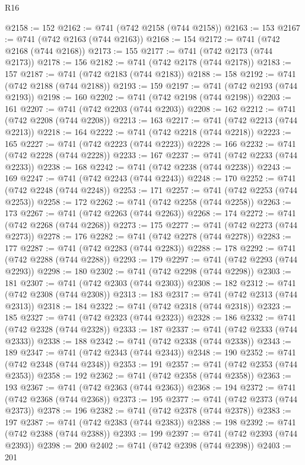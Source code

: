 \begin{lexlean}{R16}
\begin{coremodule}
@2158 := 152
@2162 := @741 (@742 @2158 (@744 @2158))
@2163 := 153
@2167 := @741 (@742 @2163 (@744 @2163))
@2168 := 154
@2172 := @741 (@742 @2168 (@744 @2168))
@2173 := 155
@2177 := @741 (@742 @2173 (@744 @2173))
@2178 := 156
@2182 := @741 (@742 @2178 (@744 @2178))
@2183 := 157
@2187 := @741 (@742 @2183 (@744 @2183))
@2188 := 158
@2192 := @741 (@742 @2188 (@744 @2188))
@2193 := 159
@2197 := @741 (@742 @2193 (@744 @2193))
@2198 := 160
@2202 := @741 (@742 @2198 (@744 @2198))
@2203 := 161
@2207 := @741 (@742 @2203 (@744 @2203))
@2208 := 162
@2212 := @741 (@742 @2208 (@744 @2208))
@2213 := 163
@2217 := @741 (@742 @2213 (@744 @2213))
@2218 := 164
@2222 := @741 (@742 @2218 (@744 @2218))
@2223 := 165
@2227 := @741 (@742 @2223 (@744 @2223))
@2228 := 166
@2232 := @741 (@742 @2228 (@744 @2228))
@2233 := 167
@2237 := @741 (@742 @2233 (@744 @2233))
@2238 := 168
@2242 := @741 (@742 @2238 (@744 @2238))
@2243 := 169
@2247 := @741 (@742 @2243 (@744 @2243))
@2248 := 170
@2252 := @741 (@742 @2248 (@744 @2248))
@2253 := 171
@2257 := @741 (@742 @2253 (@744 @2253))
@2258 := 172
@2262 := @741 (@742 @2258 (@744 @2258))
@2263 := 173
@2267 := @741 (@742 @2263 (@744 @2263))
@2268 := 174
@2272 := @741 (@742 @2268 (@744 @2268))
@2273 := 175
@2277 := @741 (@742 @2273 (@744 @2273))
@2278 := 176
@2282 := @741 (@742 @2278 (@744 @2278))
@2283 := 177
@2287 := @741 (@742 @2283 (@744 @2283))
@2288 := 178
@2292 := @741 (@742 @2288 (@744 @2288))
@2293 := 179
@2297 := @741 (@742 @2293 (@744 @2293))
@2298 := 180
@2302 := @741 (@742 @2298 (@744 @2298))
@2303 := 181
@2307 := @741 (@742 @2303 (@744 @2303))
@2308 := 182
@2312 := @741 (@742 @2308 (@744 @2308))
@2313 := 183
@2317 := @741 (@742 @2313 (@744 @2313))
@2318 := 184
@2322 := @741 (@742 @2318 (@744 @2318))
@2323 := 185
@2327 := @741 (@742 @2323 (@744 @2323))
@2328 := 186
@2332 := @741 (@742 @2328 (@744 @2328))
@2333 := 187
@2337 := @741 (@742 @2333 (@744 @2333))
@2338 := 188
@2342 := @741 (@742 @2338 (@744 @2338))
@2343 := 189
@2347 := @741 (@742 @2343 (@744 @2343))
@2348 := 190
@2352 := @741 (@742 @2348 (@744 @2348))
@2353 := 191
@2357 := @741 (@742 @2353 (@744 @2353))
@2358 := 192
@2362 := @741 (@742 @2358 (@744 @2358))
@2363 := 193
@2367 := @741 (@742 @2363 (@744 @2363))
@2368 := 194
@2372 := @741 (@742 @2368 (@744 @2368))
@2373 := 195
@2377 := @741 (@742 @2373 (@744 @2373))
@2378 := 196
@2382 := @741 (@742 @2378 (@744 @2378))
@2383 := 197
@2387 := @741 (@742 @2383 (@744 @2383))
@2388 := 198
@2392 := @741 (@742 @2388 (@744 @2388))
@2393 := 199
@2397 := @741 (@742 @2393 (@744 @2393))
@2398 := 200
@2402 := @741 (@742 @2398 (@744 @2398))
@2403 := 201

\end{coremodule}
\end{lexlean}
